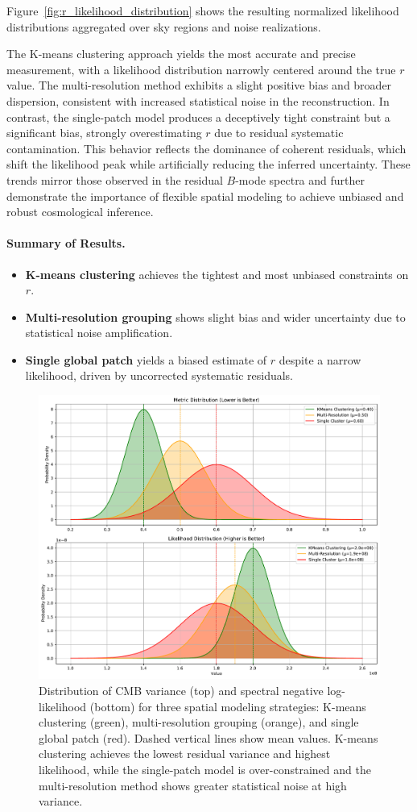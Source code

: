 \documentclass[%
 reprint,
bibnotes,
 amsmath,amssymb,
 aps,
floatfix, 
]{revtex4-2}
\begin{document}
Figure~\ref{fig:r_likelihood_distribution} shows the resulting normalized likelihood distributions aggregated over sky regions and noise realizations.

The K-means clustering approach yields the most accurate and precise measurement, with a likelihood distribution narrowly centered around the true \( r \) value. 
The multi-resolution method exhibits a slight positive bias and broader dispersion, consistent with increased statistical noise in the reconstruction. 
In contrast, the single-patch model produces a deceptively tight constraint but a significant bias, strongly overestimating \( r \) due to residual systematic contamination.
This behavior reflects the dominance of coherent residuals, which shift the likelihood peak while artificially reducing the inferred uncertainty.
These trends mirror those observed in the residual \( B \)-mode spectra and further demonstrate the importance of flexible spatial modeling to achieve unbiased and robust cosmological inference.

\paragraph{Summary of Results.}
\begin{itemize}
    \item \textbf{K-means clustering} achieves the tightest and most unbiased constraints on \( r \).
    \item \textbf{Multi-resolution grouping} shows slight bias and wider uncertainty due to statistical noise amplification.
    \item \textbf{Single global patch} yields a biased estimate of \( r \) despite a narrow likelihood, driven by uncorrected systematic residuals.
\end{itemize}

\begin{figure}[!ht]
    \centering
    \includegraphics[width=0.55\linewidth]{figures/variance_likelihood_distributions.pdf}
    \caption{
    Distribution of CMB variance (top) and spectral negative log-likelihood (bottom) for three spatial modeling strategies: K-means clustering (green), multi-resolution grouping (orange), and single global patch (red).
    Dashed vertical lines show mean values.
    K-means clustering achieves the lowest residual variance and highest likelihood, while the single-patch model is over-constrained and the multi-resolution method shows greater statistical noise at high variance.
    }

    \label{fig:metric_distributions}
\end{figure}
\end{document}
